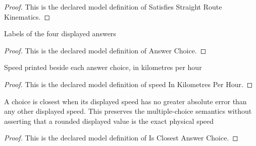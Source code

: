 \begin{proof}
  This is the declared model definition of Satisfies Straight Route Kinematics.
\end{proof}
\begin{definition}
  \label{def:physics:phyx-mini-0690:phyxminiproblems-problemphyxmini0690-answerchoice}
  Labels of the four displayed answers
\end{definition}
\begin{proof}
  This is the declared model definition of Answer Choice.
\end{proof}
\begin{definition}
  \label{def:physics:phyx-mini-0690:phyxminiproblems-problemphyxmini0690-answerchoice-speedinkilometresperhour}
  Speed printed beside each answer choice, in kilometres per hour
\end{definition}
\begin{proof}
  This is the declared model definition of speed In Kilometres Per Hour.
\end{proof}
\begin{definition}
  \label{def:physics:phyx-mini-0690:phyxminiproblems-problemphyxmini0690-isclosestanswerchoice}
  A choice is closest when its displayed speed has no greater absolute error than any other displayed speed. This preserves the multiple-choice semantics without asserting that a rounded displayed value is the exact physical speed
\end{definition}
\begin{proof}
  This is the declared model definition of Is Closest Answer Choice.
\end{proof}
